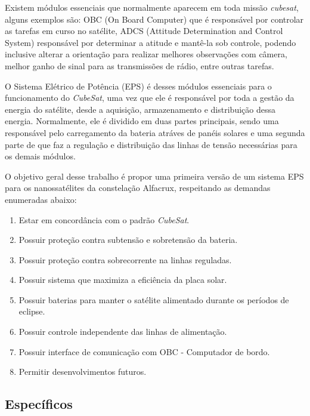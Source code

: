 Existem módulos essenciais que normalmente aparecem em toda missão \textit{cubesat}, alguns exemplos são: OBC (On Board Computer) que é responsável por controlar as tarefas em curso no satélite, ADCS (Attitude Determination and Control System) responsável por determinar a atitude e mantê-la sob controle, podendo inclusive alterar a orientação para realizar melhores observações com câmera, melhor ganho de sinal para as transmissões de rádio, entre outras tarefas.

O Sistema Elétrico de Potência (EPS) é desses módulos essenciais para o funcionamento do \textit{CubeSat}, uma vez que ele é responsável por toda a gestão da energia do satélite, desde a aquisição, armazenamento e distribuição dessa energia. Normalmente, ele é dividido em duas partes principais, sendo uma responsável pelo carregamento da bateria atráves de panéis solares e uma segunda parte de que faz a regulação e distribuição das linhas de tensão necessárias para os demais módulos. 

O objetivo geral desse trabalho é propor uma primeira versão de um sistema EPS para os nanossatélites da constelação Alfacrux, respeitando as demandas enumeradas abaixo:

\begin{enumerate}
    \item Estar em concordância com o padrão \textit{CubeSat}.
    \item Possuir proteção contra subtensão e sobretensão da bateria.
    \item Possuir proteção contra sobrecorrente na linhas reguladas.
    \item Possuir sistema que maximiza a eficiência da placa solar.
    \item Possuir baterias para manter o satélite alimentado durante os períodos de eclipse.
    \item Possuir controle independente das linhas de alimentação.
    \item Possuir interface de comunicação com OBC - Computador de bordo.
    \item Permitir desenvolvimentos futuros.
\end{enumerate}{}


\subsection*{Específicos}\label{especificos}

